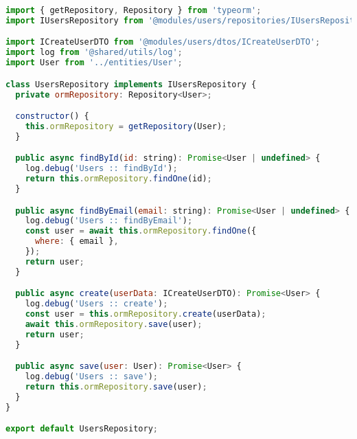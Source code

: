 \begin{lstlisting}[language=JavaScript, caption={UsersRepository.ts},captionpos=b, label=alg:usersrepository]
import { getRepository, Repository } from 'typeorm';
import IUsersRepository from '@modules/users/repositories/IUsersRepository';

import ICreateUserDTO from '@modules/users/dtos/ICreateUserDTO';
import log from '@shared/utils/log';
import User from '../entities/User';

class UsersRepository implements IUsersRepository {
  private ormRepository: Repository<User>;

  constructor() {
    this.ormRepository = getRepository(User);
  }

  public async findById(id: string): Promise<User | undefined> {
    log.debug('Users :: findById');
    return this.ormRepository.findOne(id);
  }

  public async findByEmail(email: string): Promise<User | undefined> {
    log.debug('Users :: findByEmail');
    const user = await this.ormRepository.findOne({
      where: { email },
    });
    return user;
  }

  public async create(userData: ICreateUserDTO): Promise<User> {
    log.debug('Users :: create');
    const user = this.ormRepository.create(userData);
    await this.ormRepository.save(user);
    return user;
  }

  public async save(user: User): Promise<User> {
    log.debug('Users :: save');
    return this.ormRepository.save(user);
  }
}

export default UsersRepository;
\end{lstlisting}